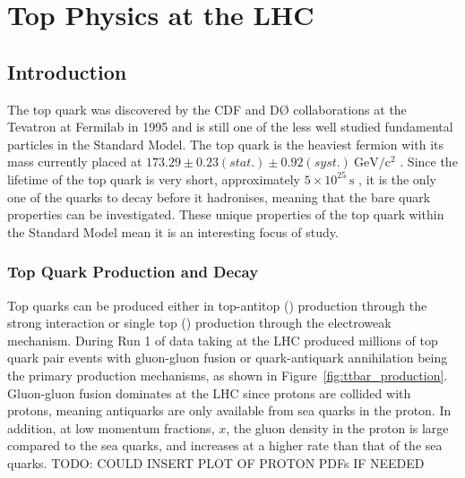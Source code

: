 \chapter{Top Physics at the LHC}
\label{c:top_physics_at_the_lhc}

\section{Introduction}
\label{s:top_physics_intro}
The top quark was discovered by the CDF and D{\O} collaborations at the Tevatron at Fermilab in 1995
\cite{Abe:1995hr, Abachi:1995iq} and is still one of the less well studied fundamental particles in the
Standard Model. The top quark is the heaviest fermion with its mass currently placed at $173.29 \pm 0.23
(stat.) \pm 0.92 (syst.)\mathrm{~GeV/c^{2}}$ \cite{top_mass}. Since the lifetime of the top quark is very
short, approximately $5 \times 10^{25}\mathrm{~s}$ \cite{Agashe:2014kda}, it is the only one of the quarks to
decay before it hadronises, meaning that the bare quark properties can be investigated. These unique
properties of the top quark within the Standard Model mean it is an interesting focus of study.

\subsection{Top Quark Production and Decay}
\label{ss:top_quark_production_and_decay}
Top quarks can be produced either in top-antitop (\ttbar) production through the strong interaction or single
top (\tquark) production through the electroweak mechanism. During Run 1 of data taking at the LHC produced
millions of top quark pair events with gluon-gluon fusion or quark-antiquark annihilation being the primary
production mechanisms, as shown in Figure~\ref{fig:ttbar_production}. Gluon-gluon fusion dominates at the LHC
since protons are collided with protons, meaning antiquarks are only available from sea quarks in the proton.
In addition, at low momentum fractions, $x$, the gluon density in the proton is large compared to the sea
quarks, and increases at a higher rate than that of the sea quarks. TODO: COULD INSERT PLOT OF PROTON
PDFs IF NEEDED %

